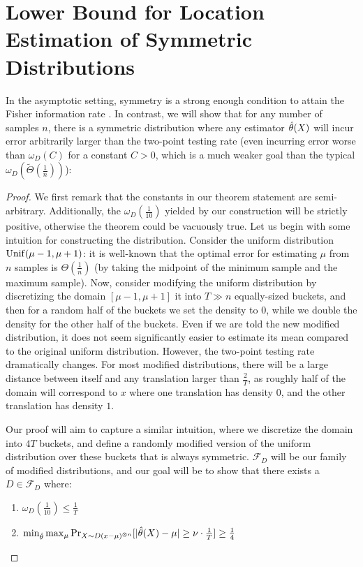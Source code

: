 \section{Lower Bound for Location Estimation of Symmetric Distributions}

In the asymptotic setting, symmetry is a strong enough condition to attain the Fisher information rate \cite{stone1975adaptive}. In contrast, we will show that for any number of samples $n$, there is a symmetric distribution where any estimator $\hat{\theta}(X)$ will incur error arbitrarily larger than the two-point testing rate (even incurring error worse than $\omega_D(C)$ for a constant $C>0$, which is a much weaker goal than the typical $\omega_D(\tilde{\Theta}(\tfrac{1}{n}))$):

\loclb*
\begin{proof}
We first remark that the constants in our theorem statement are semi-arbitrary. 
Additionally, the $\omega_{D}(\frac{1}{10})$ yielded by our construction will be strictly positive, otherwise the theorem could be vacuously true. Let us begin with some intuition for constructing the distribution. Consider the uniform distribution $\operatorname{Unif}(\mu-1,\mu+1)$: it is well-known that the optimal error for estimating $\mu$ from $n$ samples is $\Theta(\frac{1}{n})$ (by taking the midpoint of the minimum sample and the maximum sample). Now, consider modifying the uniform distribution by discretizing the domain $[\mu-1,\mu+1]$ it into $T \gg n$ equally-sized buckets, and then for a random half of the buckets we set the density to $0$, while we double the density for the other half of the buckets. Even if we are told the new modified distribution, it does not seem significantly easier to estimate its mean compared to the original uniform distribution. However, the two-point testing rate dramatically changes. For most modified distributions, there will be a large distance between itself and any translation larger than $\frac{2}{T}$, as roughly half of the domain will correspond to $x$ where one translation has density $0$, and the other translation has density $1$.

Our proof will aim to capture a similar intuition, where we discretize the domain into $4T$ buckets, and define a randomly modified version of the uniform distribution over these buckets that is always symmetric. $\mathcal{F}_D$ will be our family of modified distributions, and our goal will be to show that there exists a $D \in \mathcal{F}_D$ where:

\begin{enumerate}
    \item $\omega_D(\frac{1}{10}) \le \frac{1}{T}$
    \item $\min_{\hat{\theta}} \max_\mu \operatorname{{Pr}}_{X \sim D(x-\mu)^{\otimes n}}[|\hat{\theta}(X)-\mu| \ge \nu \cdot \frac{1}{T}] \ge \frac{1}{4}$
\end{enumerate}


\end{proof}
